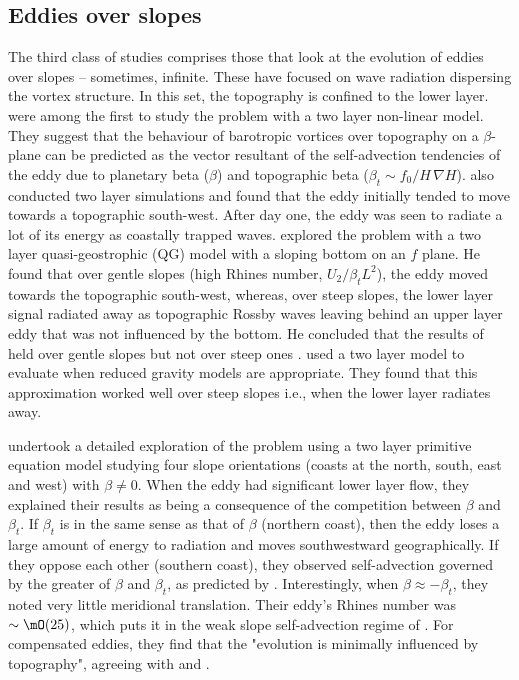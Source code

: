 \subsection{Eddies over slopes}
\label{sec-1-4}
\label{sec:introslope}
The third class of studies comprises those that look at the evolution of eddies over slopes -- sometimes, infinite. These have focused on wave radiation dispersing the vortex structure. In this set, the topography is confined to the lower layer. \citet{Smith1983} were among the first to study the problem with a two layer non-linear model. They suggest that the behaviour of barotropic vortices over topography on a $β$-plane can be predicted as the vector resultant of the self-advection tendencies of the eddy due to planetary beta ($β$)  and topographic beta ($β_t \sim f_0/H\, ∇H$). \citet{Grimshaw1994} also conducted two layer simulations and found that the eddy initially tended to move towards a topographic south-west. After day one, the eddy was seen to radiate a lot of its energy as coastally trapped waves. \citet{LaCasce1998} explored the problem with a two layer quasi-geostrophic (QG) model with a sloping bottom on an $f$ plane. He found that over gentle slopes (high Rhines number, $U_2/β_tL^2$), the eddy moved towards the topographic south-west, whereas, over steep slopes, the lower layer signal radiated away as topographic Rossby waves leaving behind an upper layer eddy that was not influenced by the bottom. He concluded that the results of \citet{Smith1983} held over gentle slopes but not over steep ones \citep[see also][]{LaCasce1996}. \citet{Thierry1999} used a two layer model to evaluate when reduced gravity models are appropriate. They found that this approximation worked well over steep slopes i.e., when the lower layer radiates away.

\citet{Jacob2002} undertook a detailed exploration of the problem using a two layer primitive equation model studying four slope orientations (coasts at the north, south, east and west) with $β≠0$. When the eddy had significant lower layer flow, they explained their results as being a consequence of the competition between $β$ and $β_t$. If $β_t$ is in the same sense as that of $β$ (northern coast), then the eddy loses a large amount of energy to radiation and moves southwestward geographically. If they oppose each other (southern coast), they observed self-advection governed by the greater of $β$ and $β_t$, as predicted by \citet{Smith1983}. Interestingly, when $β≈-β_t$, they noted very little meridional translation. Their eddy's Rhines number was $\sim \mO(25)$, which puts it in the weak slope self-advection regime of \citet{LaCasce1998}. For compensated eddies, they find that the "evolution is minimally influenced by topography", agreeing with \citet{Smith1983} and \citet{Kamenkovich1996}.

